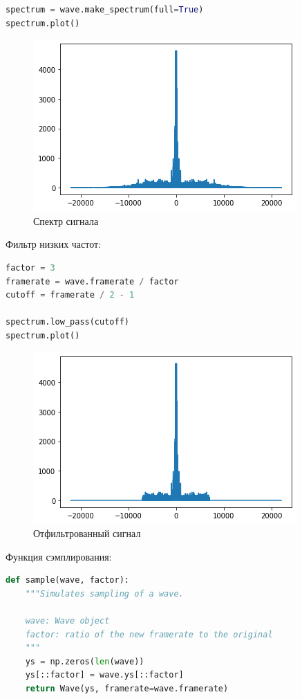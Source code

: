 \begin{lstlisting}[language=Python]
spectrum = wave.make_spectrum(full=True)
spectrum.plot()
\end{lstlisting}
\begin{figure}[H]
	\begin{center}
		\includegraphics[scale=1]{fig/lab11/lab11_8_0.png}
		\caption{Спектр сигнала}
	\end{center}
\end{figure}

Фильтр низких частот:

\begin{lstlisting}[language=Python]
factor = 3
framerate = wave.framerate / factor
cutoff = framerate / 2 - 1

spectrum.low_pass(cutoff)
spectrum.plot()
\end{lstlisting}
\begin{figure}[H]
	\begin{center}
		\includegraphics[scale=1]{fig/lab11/lab11_11_0.png}
		\caption{Отфильтрованный сигнал}
	\end{center}
\end{figure}

Функция сэмплирования:

\begin{lstlisting}[language=Python]
def sample(wave, factor):
    """Simulates sampling of a wave.
    
    wave: Wave object
    factor: ratio of the new framerate to the original
    """
    ys = np.zeros(len(wave))
    ys[::factor] = wave.ys[::factor]
    return Wave(ys, framerate=wave.framerate) 
\end{lstlisting}



